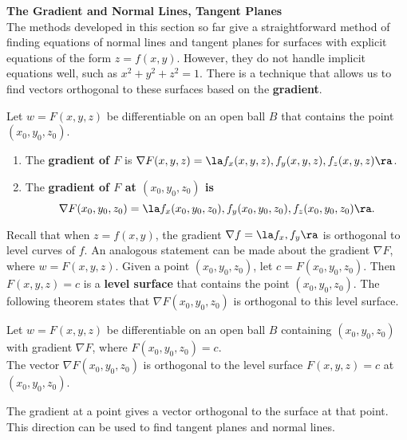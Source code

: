 \noindent\textbf{\large The Gradient and Normal Lines, Tangent Planes}\\

The methods developed in this section so far give a straightforward method of finding equations of normal lines and tangent planes for surfaces with explicit equations of the form $z=f(x,y)$. However, they do not handle implicit equations well, such as $x^2+y^2+z^2=1$. There is a technique that allows us to find vectors orthogonal to these surfaces based on the \textbf{gradient}.

{Let $w=F(x,y,z)$ be differentiable on an open ball $B$ that contains the point $(x_0,y_0,z_0)$.
\begin{enumerate}
	\item The \textbf{gradient of $F$} is $\nabla F(x,y,z) = \la f_x(x,y,z),f_y(x,y,z),f_z(x,y,z)\ra$.
	\item The \textbf{gradient of $F$ at $(x_0,y_0,z_0)$ is 
	\[
	\nabla F(x_0,y_0,z_0) = \la f_x(x_0,y_0,z_0),f_y(x_0,y_0,z_0),f_z(x_0,y_0,z_0)\ra.
	\]}
\end{enumerate}
\baselineskip
}

Recall that when $z=f(x,y)$, the gradient $\nabla f = \la f_x,f_y\ra$ is orthogonal to level curves of $f$. An analogous statement can be made about the gradient $\nabla F$, where $w= F(x,y,z)$. Given a point $(x_0,y_0,z_0)$, let $c = F(x_0,y_0,z_0)$. Then $F(x,y,z) = c$ is a \textbf{level surface} that contains the point $(x_0,y_0,z_0)$. The following theorem states that $\nabla F(x_0,y_0,z_0)$ is orthogonal to this level surface.

{Let $w=F(x,y,z)$ be differentiable on an open ball $B$ containing $(x_0,y_0,z_0)$ with gradient $\nabla F$, where $F(x_0,y_0,z_0) = c$. \\

The vector $\nabla F(x_0,y_0,z_0)$ is orthogonal to the level surface $F(x,y,z)=c$ at $(x_0,y_0,z_0)$.
}

The gradient at a point gives a vector orthogonal to the surface at that point. This direction can be used to find tangent planes and normal lines.\\

